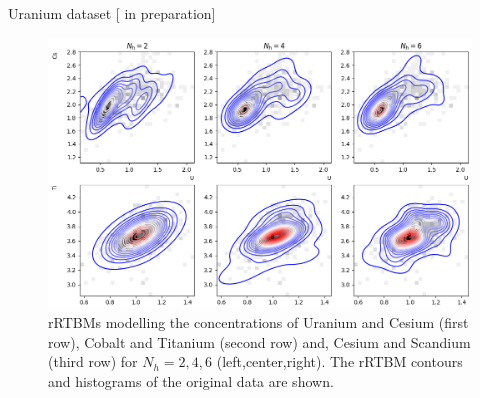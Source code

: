 \documentclass[10pt]{beamer}
\begin{document}
\begin{frame}{Uranium dataset \hfill \small [\cite{new} in preparation]}

    \begin{figure}
        \includegraphics[width=\textwidth]{figures/uranium.png}
            \caption{rRTBMs modelling the concentrations of Uranium
            and Cesium (first row), Cobalt and Titanium (second row) and, Cesium and Scandium (third row) for $N_h = 2,4,6$ (left,center,right).
                 The rRTBM contours and histograms of the original data are shown.}
    \end{figure}
    
    
\end{frame}
\end{document}
